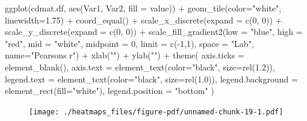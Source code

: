 \documentclass[
  letterpaper,
  DIV=11,
  numbers=noendperiod]{scrreprt}
\newenvironment{Shaded}{\begin{snugshade}}{\end{snugshade}}
\newcommand{\AttributeTok}[1]{\textcolor[rgb]{0.40,0.45,0.13}{#1}}
\newcommand{\DecValTok}[1]{\textcolor[rgb]{0.68,0.00,0.00}{#1}}
\newcommand{\FloatTok}[1]{\textcolor[rgb]{0.68,0.00,0.00}{#1}}
\newcommand{\FunctionTok}[1]{\textcolor[rgb]{0.28,0.35,0.67}{#1}}
\newcommand{\NormalTok}[1]{\textcolor[rgb]{0.00,0.23,0.31}{#1}}
\newcommand{\SpecialCharTok}[1]{\textcolor[rgb]{0.37,0.37,0.37}{#1}}
\newcommand{\StringTok}[1]{\textcolor[rgb]{0.13,0.47,0.30}{#1}}
\begin{document}
\begin{Shaded}
\begin{Highlighting}[]
\FunctionTok{ggplot}\NormalTok{(cdmat.df, }\FunctionTok{aes}\NormalTok{(Var1, Var2, }\AttributeTok{fill =}\NormalTok{ value)) }\SpecialCharTok{+} 
  \FunctionTok{geom\_tile}\NormalTok{(}\AttributeTok{color=}\StringTok{"white"}\NormalTok{, }\AttributeTok{linewidth=}\FloatTok{1.75}\NormalTok{) }\SpecialCharTok{+}
  \FunctionTok{coord\_equal}\NormalTok{() }\SpecialCharTok{+}
  \FunctionTok{scale\_x\_discrete}\NormalTok{(}\AttributeTok{expand =} \FunctionTok{c}\NormalTok{(}\DecValTok{0}\NormalTok{, }\DecValTok{0}\NormalTok{)) }\SpecialCharTok{+}
  \FunctionTok{scale\_y\_discrete}\NormalTok{(}\AttributeTok{expand =} \FunctionTok{c}\NormalTok{(}\DecValTok{0}\NormalTok{, }\DecValTok{0}\NormalTok{)) }\SpecialCharTok{+} 
  \FunctionTok{scale\_fill\_gradient2}\NormalTok{(}\AttributeTok{low =} \StringTok{"blue"}\NormalTok{, }\AttributeTok{high =} \StringTok{"red"}\NormalTok{, }\AttributeTok{mid =} \StringTok{"white"}\NormalTok{, }
                       \AttributeTok{midpoint =} \DecValTok{0}\NormalTok{, }\AttributeTok{limit =} \FunctionTok{c}\NormalTok{(}\SpecialCharTok{{-}}\DecValTok{1}\NormalTok{,}\DecValTok{1}\NormalTok{), }\AttributeTok{space =} \StringTok{"Lab"}\NormalTok{, }
                       \AttributeTok{name=}\StringTok{"Pearson\textquotesingle{}s r"}\NormalTok{)  }\SpecialCharTok{+}
  \FunctionTok{xlab}\NormalTok{(}\StringTok{""}\NormalTok{) }\SpecialCharTok{+} 
  \FunctionTok{ylab}\NormalTok{(}\StringTok{""}\NormalTok{) }\SpecialCharTok{+}
  \FunctionTok{theme}\NormalTok{(}
    \AttributeTok{axis.ticks =} \FunctionTok{element\_blank}\NormalTok{(), }
    \AttributeTok{axis.text =} \FunctionTok{element\_text}\NormalTok{(}\AttributeTok{color=}\StringTok{"black"}\NormalTok{, }\AttributeTok{size=}\FunctionTok{rel}\NormalTok{(}\FloatTok{1.2}\NormalTok{)),}
    \AttributeTok{legend.text =} \FunctionTok{element\_text}\NormalTok{(}\AttributeTok{color=}\StringTok{"black"}\NormalTok{, }\AttributeTok{size=}\FunctionTok{rel}\NormalTok{(}\FloatTok{1.0}\NormalTok{)),}
    \AttributeTok{legend.background =} \FunctionTok{element\_rect}\NormalTok{(}\AttributeTok{fill=}\StringTok{"white"}\NormalTok{),}
    \AttributeTok{legend.position =} \StringTok{"bottom"}
\NormalTok{  )}
\end{Highlighting}
\end{Shaded}

\begin{figure}[H]

{\centering \texttt{[image: ./heatmaps\_files/figure-pdf/unnamed-chunk-19-1.pdf]}

}

\end{figure}
\end{document}
